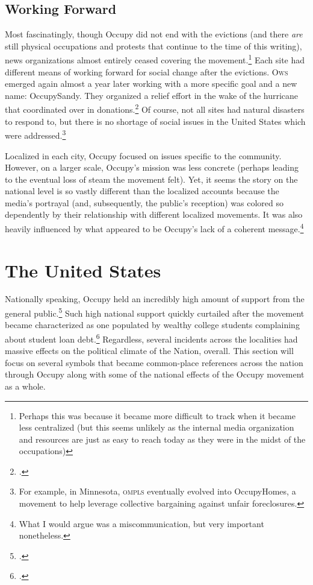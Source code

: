 \documentclass[openany,twoside]{memoir}
\begin{document}
\begin{Spacing}{2}
\subsection{Working Forward}
Most fascinatingly, though Occupy did not end with the evictions (and there \emph{are} still physical occupations and protests that continue to the time of this writing), news organizations almost entirely ceased covering the movement.\footnote{
Perhaps this was because it became more difficult to track when it became less centralized (but this seems unlikely as the internal media organization and resources are just as easy to reach today as they were in the midst of the occupations)}
Each site had different means of working forward for social change after the evictions.
\textsc{Ows} emerged again almost a year later working with a more specific goal and a new name: OccupySandy.
They organized a relief effort in the wake of the hurricane that coordinated over  in donations.\footcite[35--36]{milkman13}
Of course, not all sites had natural disasters to respond to, but there is no shortage of social issues in the United States which were addressed.\footnote{
For example, in Minnesota, \textsc{ompls} eventually evolved into OccupyHomes, a movement to help leverage collective bargaining against unfair foreclosures.}

Localized in each city, Occupy focused on issues specific to the community.
However, on a larger scale, Occupy's mission was less concrete (perhaps leading to the eventual loss of steam the movement felt).
Yet, it seems the story on the national level is so vastly different than the localized accounts because the media's portrayal (and, subsequently, the public's reception) was colored so dependently by their relationship with different localized movements.
It was also heavily influenced by what appeared to be Occupy's lack of a coherent message.\footnote{
What I would argue was a miscommunication, but very important nonetheless.}

\section{The United States}
Nationally speaking, Occupy held an incredibly high amount of support from the general public.\footcite{cooper11}
Such high national support quickly curtailed after the movement became characterized as one populated by wealthy college students complaining about student loan debt.\footcite{bella12,zakarin11}
Regardless, several incidents across the localities had massive effects on the political climate of the Nation, overall.
This section will focus on several symbols that became common-place references across the nation through Occupy along with some of the national effects of the Occupy movement as a whole.


\end{Spacing}
\end{document}
